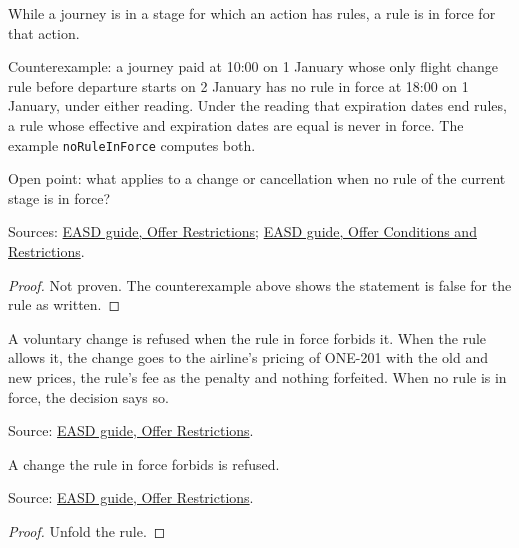 \begin{theorem}
  \label{thm:offers-rule-covers-stage}
  While a journey is in a stage for which an action has rules, a rule is in
  force for that action.

  Counterexample: a journey paid at 10:00 on 1 January whose only flight
  change rule before departure starts on 2 January has no rule in force at
  18:00 on 1 January, under either reading. Under the reading that
  expiration dates end rules, a rule whose effective and expiration dates
  are equal is never in force. The example \texttt{noRuleInForce} computes
  both.

  Open point: what applies to a change or cancellation when no rule of the
  current stage is in force?

  Sources: \href{https://standards.atlassian.net/wiki/spaces/EASD/pages/574259692/Offer+Restrictions}{EASD guide, Offer Restrictions};
  \href{https://standards.atlassian.net/wiki/spaces/EASD/pages/574816307/Offer+Conditions+and+Restrictions}{EASD guide, Offer Conditions and Restrictions}.
\end{theorem}
\begin{proof}
  Not proven. The counterexample above shows the statement is false for the
  rule as written.
\end{proof}

\begin{definition}
  \label{def:offers-voluntary-change}
  A voluntary change is refused when the rule in force forbids it. When the
  rule allows it, the change goes to the airline's pricing of ONE-201 with
  the old and new prices, the rule's fee as the penalty and nothing
  forfeited. When no rule is in force, the decision says so.

  Source: \href{https://standards.atlassian.net/wiki/spaces/EASD/pages/574259692/Offer+Restrictions}{EASD guide, Offer Restrictions}.
\end{definition}

\begin{theorem}
  \label{thm:offers-change-refused}
  A change the rule in force forbids is refused.

  Source: \href{https://standards.atlassian.net/wiki/spaces/EASD/pages/574259692/Offer+Restrictions}{EASD guide, Offer Restrictions}.
\end{theorem}
\begin{proof}
  Unfold the rule.
\end{proof}

